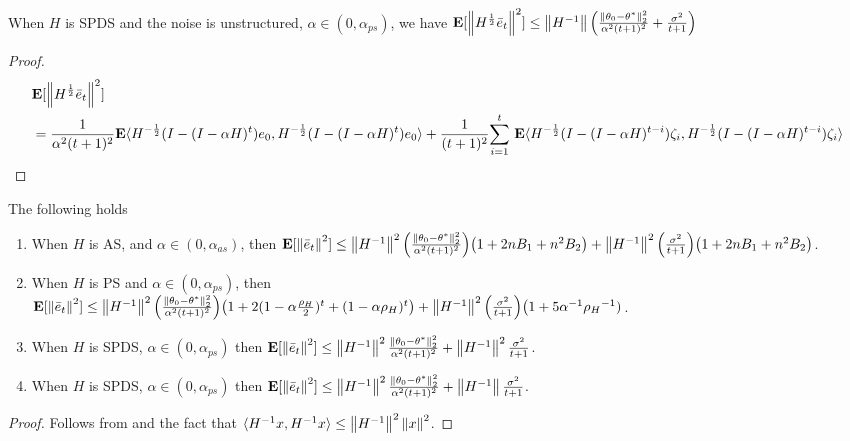\begin{theorem}\label{spdsaushalf}
When $H$ is SPDS and the noise is unstructured, $\alpha \in (0,\alpha_{ps})$, we have
$\E[\norm{H^{\frac{1}{2}}\eb_t}^2]\leq \norm{H^{-1}} \Big(\frac{\norm{\theta_0-\ts}^2_2}{\alpha^2(t+1)^2}+\frac{\sigma^2}{t+1}\Big)$
\end{theorem}
\begin{proof}
\begin{align*}
&\E[\norm{H^{\frac{1}{2}}\eb_t}^2]\\
&=\frac{1}{\alpha^2(t+1)^2}\E\ip{H^{-\frac{1}{2}}(I-(I-\alpha H)^t)e_0,H^{-\frac{1}{2}}(I-(I-\alpha H)^t)e_0}+\frac{1}{(t+1)^2}\ous{\sum}{i=1}{t}\E\ip{H^{-\frac{1}{2}}(I-(I-\alpha H)^{t-i}) \zeta_i,H^{-\frac{1}{2}}(I-(I-\alpha H)^{t-i}) \zeta_i}
\end{align*}
\end{proof}
\begin{theorem}\label{blanket}
The following holds
\begin{enumerate}
\item When $H$ is AS, and $\alpha \in (0,\alpha_{as})$, then $\E[\norm{\eb_t}^2]\leq \norm{H^{-1}}^2\Big(\frac{\norm{\theta_0-\ts}^2_2}{\alpha^2(t+1)^2}\Big)\big(1+2nB_1+n^2B_2\big)+\norm{H^{-1}}^2\Big(\frac{\sigma^2}{t+1}\Big)\big(1+2nB_1+n^2B_2\big)$.
\item When $H$ is PS and  $\alpha \in (0,\alpha_{ps})$, then  $\E[\norm{\eb_t}^2]\leq \norm{H^{-1}}^2\Big(\frac{\norm{\theta_0-\ts}^2_2}{\alpha^2(t+1)^2}\Big)\big(1+2(1-\alpha\frac{\rho_H}{2})^t+(1-\alpha\rho_H)^t\big)+\norm{H^{-1}}^2\Big(\frac{\sigma^2}{t+1}\Big)\big(1+5\alpha^{-1}{\rho_H}^{-1})$.
\item When $H$ is SPDS, $\alpha \in (0,\alpha_{ps})$  then $\E[\norm{\eb_t}^2]\leq\norm{H^{-1}}^2\frac{\norm{\theta_0-\ts}^2_2}{\alpha^2(t+1)^2}+\norm{H^{-1}}^2\frac{\sigma^2}{t+1}$.
\item When $H$ is SPDS, $\alpha\in (0,\alpha_{ps})$  then  $\E[\norm{\eb_t}^2]\leq \norm{H^{-1}}^2\frac{\norm{\theta_0-\ts}^2_2}{\alpha^2(t+1)^2}+\norm{H^{-1}}\frac{\sigma^2}{t+1}$.
\end{enumerate}
\end{theorem}
\begin{proof}
Follows from  and the fact that $\ip{H^{-1}x,H^{-1}x}\leq \norm{H^{-1}}^2\norm{x}^2$.
\end{proof}

